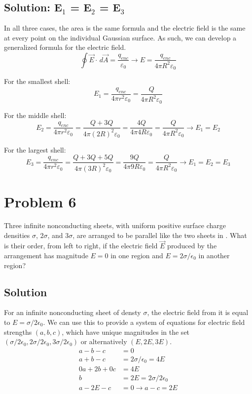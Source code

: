 \documentclass[12pt]{article}
\begin{document}
\subsection*{Solution: E$_1$ = E$_2$ = E$_3$}
In all three cases, the area is the same formula and the electric field is the same at every point on the individual Gaussian surface. As such, we can develop a generalized formula for the electric field.
\begin{equation*}
    \oint \vec{E} \cdot \,d\vec{A} = \frac{q_{enc}}{\varepsilon_0} \rightarrow
    E = \frac{q_{enc}}{4\pi R^2 \varepsilon_0}
\end{equation*}

For the smallest shell:
\begin{equation*}
    E_1 = \frac{q_{enc}}{4\pi r^2 \varepsilon_0} = \frac{Q}{4\pi R^2 \varepsilon_0}
\end{equation*}

For the middle shell:
\begin{equation*}
    E_2 = \frac{q_{enc}}{4\pi r^2 \varepsilon_0} = \frac{Q + 3Q}{4\pi (2R)^2 \varepsilon_0}
        =   \frac{4Q}{4\pi 4R \varepsilon_0} = \frac{Q}{4\pi R^2 \varepsilon_0} \rightarrow E_1 = E_2
\end{equation*}

For the largest shell:
\begin{equation*}
    E_3 = \frac{q_{enc}}{4\pi r^2 \varepsilon_0} = \frac{Q + 3Q + 5Q}{4\pi (3R)^2 \varepsilon_0}
        =   \frac{9Q}{4\pi 9R \varepsilon_0} = \frac{Q}{4\pi R^2 \varepsilon_0} \rightarrow \boxed{E_1 = E_2 = E_3}
\end{equation*}


\pagebreak
\section{Problem 6}
Three infinite nonconducting sheets, with uniform positive surface charge densities $\sigma$, $2\sigma$, and $3\sigma$, are arranged to be parallel like the two sheets in . What is their order, from left to right, if the electric field $\vec{E}$ produced by the arrangement has magnitude $E = 0$ in one region and $E = 2\sigma/\epsilon_0$ in another region?

\subsection*{Solution}
For an infinite nonconducting sheet of densty $\sigma$, the electric field from it is equal to $E = \sigma/2\epsilon_0$. We can use this to provide a system of equations for electric field strengths $(a, b, c)$, which have unique magnitudes in the set $(\sigma/2\epsilon_0, 2\sigma/2\epsilon_0, 3\sigma/2\epsilon_0)$ or alternatively $(E, 2E, 3E)$. 
\begin{align*}
    a - b - c &= 0\\
    a + b - c &= 2\sigma/\epsilon_0 = 4E\\
    0a + 2b + 0c &= 4E\\
    b &= 2E = 2\sigma/2\epsilon_0\\
    a - 2E - c &= 0 \rightarrow a - c = 2E
\end{align*}
\end{document}

